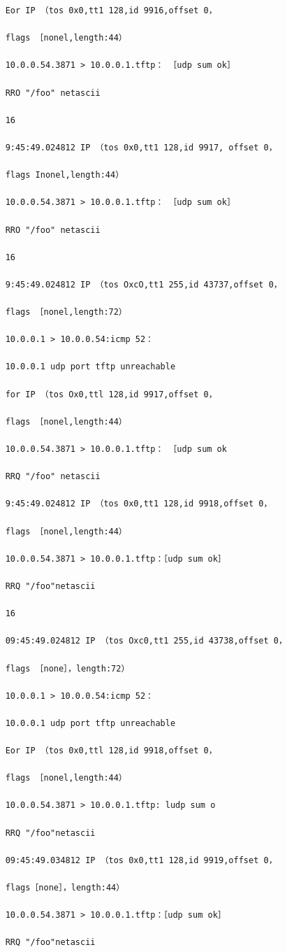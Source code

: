 \begin{verbatim}
	Eor IP （tos 0x0,tt1 128,id 9916,offset 0，

	flags ［nonel,length:44）

	10.0.0.54.3871 > 10.0.0.1.tftp： ［udp sum ok］

	RRO "/foo" netascii

	16

	9:45:49.024812 IP （tos 0x0,tt1 128,id 9917, offset 0，

	flags Inonel,length:44）

	10.0.0.54.3871 > 10.0.0.1.tftp： ［udp sum ok］

	RRO "/foo" netascii

	16

	9:45:49.024812 IP （tos OxcO,tt1 255,id 43737,offset 0，

	flags ［nonel,length:72）

	10.0.0.1 > 10.0.0.54:icmp 52：

	10.0.0.1 udp port tftp unreachable

	for IP （tos Ox0,ttl 128,id 9917,offset 0，

	flags ［nonel,length:44）

	10.0.0.54.3871 > 10.0.0.1.tftp： ［udp sum ok

	RRQ "/foo" netascii

	9:45:49.024812 IP （tos 0x0,tt1 128,id 9918,offset 0，

	flags ［nonel,length:44）

	10.0.0.54.3871 > 10.0.0.1.tftp：［udp sum ok］

	RRQ "/foo"netascii

	16

	09:45:49.024812 IP （tos Oxc0,tt1 255,id 43738,offset 0，

	flags ［none］，length:72）

	10.0.0.1 > 10.0.0.54:icmp 52：

	10.0.0.1 udp port tftp unreachable

	Eor IP （tos 0x0,ttl 128,id 9918,offset 0，

	flags ［nonel,length:44）

	10.0.0.54.3871 > 10.0.0.1.tftp: ludp sum o

	RRQ "/foo"netascii

	09:45:49.034812 IP （tos 0x0,tt1 128,id 9919,offset 0，

	flags［none］，length:44）

	10.0.0.54.3871 > 10.0.0.1.tftp：［udp sum ok］

	RRQ "/foo"netascii


\end{verbatim}
